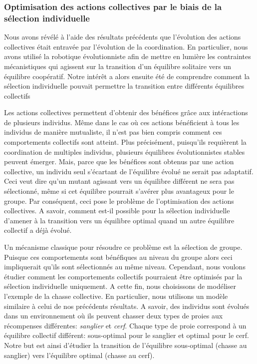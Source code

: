 		\subsubsection{Optimisation des actions collectives par le biais de la sélection individuelle}

			Nous avons révélé à l'aide des résultats précédents que l'évolution des actions collectives était entravée par l'évolution de la coordination. En particulier, nous avons utilisé la robotique évolutionniste afin de mettre en lumière les contraintes mécanistiques qui agissent sur la transition d'un équilibre solitaire vers un équilibre coopératif. Notre intérêt a alors ensuite été de comprendre comment la sélection individuelle pouvait permettre la transition entre différents équilibres collectifs

			Les actions collectives permettent d'obtenir des bénéfices grâce aux intéractions de plusieurs individus. Même dans le cas où ces actions bénéficient à tous les individus de manière mutualiste, il n'est pas bien compris comment ces comportements collectifs sont atteint. Plus précisément, puisqu'ils requièrent la coordination de multiples individus, plusieurs équilibres évolutionnistes stables peuvent émerger. Mais, parce que les bénéfices sont obtenus par une action collective, un individu seul s'écartant de l'équilibre évolué ne serait pas adaptatif. Ceci veut dire qu'un mutant agissant vers un équilibre différent ne sera pas sélectionné, même si cet équilibre pourrait s'avérer plus avantageux pour le groupe. Par conséquent, ceci pose le problème de l'optimisation des actions collectives. A savoir, comment est-il possible pour la sélection individuelle d'amener à la transition vers un équilibre optimal quand un autre équilibre collectif a déjà évolué.

			Un mécanisme classique pour résoudre ce problème est la sélection de groupe. Puisque ces comportements sont bénéfiques au niveau du groupe alors ceci impliquerait qu'ils sont sélectionnés au même niveau. Cependant, nous voulons étudier comment les comportements collectifs pourraient être optimisés par la sélection individuelle uniquement. A cette fin, nous choisissons de modéliser l'exemple de la chasse collective. En particulier, nous utilisons un modèle similaire à celui de nos précédents résultats. A savoir, des individus sont évolués dans un environnement où ils peuvent chasser deux types de proies aux récompenses différentes: \emph{sanglier} et \emph{cerf}. Chaque type de proie correspond à un équilibre collectif différent: sous-optimal pour le sanglier et optimal pour le cerf. Notre but est ainsi d'étudier la transition de l'équilibre sous-optimal (chasse au sanglier) vers l'équilibre optimal (chasse au cerf).

